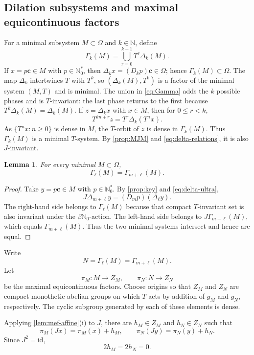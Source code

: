 \documentclass[reqno,12pt]{amsart}
\newtheorem{lemma}[thm]{Lemma}
\newcommand{\Nzero}{\mathbb N_0}
\newcommand{\bN}{\beta\Nzero}
\newcommand{\Nstar}{\Nzero^{*}}
\def \N {\mathbb N}
\numberwithin{equation}{section}
\begin{document}
\subsection{Dilation subsystems and maximal equicontinuous factors}\label{sec:weighted-mef}

For a minimal subsystem $M\subset\Omega$ and $k\in\N$, define
\begin{equation}\label{eq:Gamma}
 \Gamma_k(M)=\bigcup_{r=0}^{k-1}T^r\Delta_k(M).
\end{equation}
If $x=p\mathbf c\in M$ with $p\in\Nstar$, then
$\Delta_kx=(D_k p)\mathbf c\in\Omega$; hence
$\Gamma_k(M)\subset\Omega$. The map $\Delta_k$ intertwines $T$ with
$T^k$, so $(\Delta_k(M),T^k)$ is a factor of the minimal system $(M,T)$
and is minimal.  The union in \eqref{eq:Gamma} adds the $k$ possible
phases and is $T$-invariant: the last phase returns to the first because
$T^k\Delta_k(M)=\Delta_k(M)$.  If $z=\Delta_kx$ with $x\in M$, then for
$0\leq r<k$,
\[
 T^{kn+r}z=T^r\Delta_k(T^nx).
\]
As $\{T^nx:n\geq0\}$ is dense in $M$, the $T$-orbit of $z$ is dense in
$\Gamma_k(M)$. Thus $\Gamma_k(M)$ is a minimal $T$-system. By \cref{prop:MJM} and
\eqref{eq:delta-relations}, it is also $J$-invariant.

\begin{lemma}\label{lem:Gamma-equal}
For every minimal $M\subset\Omega$,
\[
 \Gamma_\ell(M)=\Gamma_{m+\ell}(M).
\]
\end{lemma}

\begin{proof}
Take $y=p\mathbf c\in M$ with $p\in\Nstar$. By \cref{prop:key}
and \eqref{eq:delta-ultra},
\[
 J\Delta_{m+\ell}y=(D_m p)(\Delta_\ell y).
\]
The right-hand side belongs to $\Gamma_\ell(M)$ because that compact
$T$-invariant set is also invariant under the $\bN$-action.  The
left-hand side belongs
to $J\Gamma_{m+\ell}(M)$, which equals $\Gamma_{m+\ell}(M)$.  Thus the two
minimal systems intersect and hence are equal.
\end{proof}

Write
\[
 N=\Gamma_\ell(M)=\Gamma_{m+\ell}(M).
\]
Let
\[
 \pi_M:M\to Z_M,
 \qquad
 \pi_N:N\to Z_N
\]
be the maximal equicontinuous factors. Choose origins so that $Z_M$ and $Z_N$ are compact monothetic abelian
groups on which $T$ acts by addition of $g_M$ and $g_N$, respectively. The
cyclic subgroup generated by each of these elements is dense.

Applying \cref{lem:mef-affine}(i) to $J$, there are
$h_M\in Z_M$ and $h_N\in Z_N$ such that
\begin{equation}\label{eq:Jfactor}
 \pi_M(Jx)=\pi_M(x)+h_M,
 \qquad
 \pi_N(Jy)=\pi_N(y)+h_N.
\end{equation}
Since $J^2=\mathrm{id}$,
\begin{equation}\label{eq:twoh}
 2h_M=2h_N=0.
\end{equation}
\end{document}
